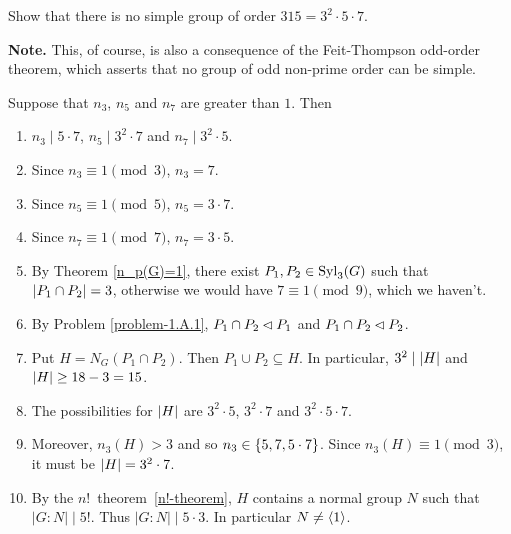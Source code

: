 \begin{probl}
    Show that there is no simple group of order\/ $315 = 3^2\cdot5\cdot7$.

    \textrm{\rm\textbf{Note.} This, of course, is also a consequence of the Feit-Thompson odd-order theorem, which asserts that no group of odd non-prime order can be simple.}
\end{probl}

\begin{solution} Suppose that $n_3$, $n_5$ and $n_7$ are greater than $1$. Then
\begin{enumerate}[\rm1.]
    \item $n_3\mid5\cdot7$, $n_5\mid3^2\cdot7$ and $n_7\mid3^2\cdot5$.
    \item Since $n_3\equiv1\pmod3$, $n_3=7$.
    \item Since $n_5\equiv1\pmod5$, $n_5=3\cdot7$.
    \item Since $n_7\equiv1\pmod7$, $n_7=3\cdot5$.
    \item By Theorem \ref{n_p(G)=1}, there exist $P_1,P_2\in{\rm Syl}_3(G)$ such that $\left\vert{P_1\cap P_2}\right\vert=3$, otherwise we would have $7\equiv1\pmod9$, which we haven't.
    \item By Problem \ref{problem-1.A.1}, $P_1\cap P_2\lhd P_1$ and $P_1\cap P_2\lhd P_2$.
    \item Put $H=N_G(P_1\cap P_2)$. Then $P_1\cup P_2\subseteq H$. In particular, $3^2\mid\left\vert{H}\right\vert$ and $\left\vert{H}\right\vert\ge 18-3=15$.
    \item The possibilities for $\left\vert{H}\right\vert$ are $3^2\cdot5$, $3^2\cdot7$ and $3^2\cdot5\cdot7$.
    \item Moreover, $n_3(H)>3$ and so $n_3\in\{5,7,5\cdot7\}$. Since $n_3(H)\equiv1\pmod3$, it must be $\left\vert{H}\right\vert=3^2\cdot7$.
    \item By the $n!$~theorem~\ref{n!-theorem}, $H$ contains a normal group $N$ such that $|G:N|\mid5!$. Thus $|G:N|\mid5\cdot3$. In particular $N\ne\langle1\rangle$.
\end{enumerate}
\end{solution}

